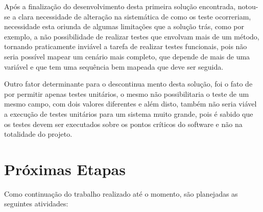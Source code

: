 \documentclass[tg]{mdtufsm}
\begin{document}
Após a finalização do desenvolvimento desta primeira solução encontrada, notou-se a clara necessidade de alteração na sistemática de como os teste ocorreriam, necessidade esta oriunda de algumas limitações que a solução trás, como por exemplo, a não possibilidade de realizar testes que envolvam mais de um método, tornando praticamente inviável a tarefa de realizar testes funcionais, pois não seria possível mapear um cenário mais completo, que depende de mais de uma variável e que tem uma sequência bem mapeada que deve ser seguida. 

Outro fator determinante para o descontinua mento desta solução, foi o fato de por permitir apenas testes unitários, o mesmo não possibilitaria o teste de um mesmo campo, com dois valores diferentes e além disto, também não seria viável a execução de testes unitários para um sistema muito grande, pois é sabido que os testes devem ser executados sobre os pontos críticos do software e não na totalidade do projeto.

\chapter{Próximas Etapas}
Como continuação do trabalho realizado até o momento, são planejadas as seguintes atividades:

\setlength{\baselineskip}{\baselineskip}


\end{document}
